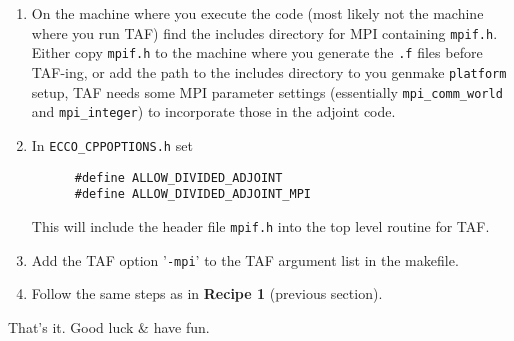 \begin{enumerate}

\item
On the machine where you execute the code
(most likely not the machine where you run TAF)
find the includes directory for MPI containing {\tt mpif.h}.
Either copy {\tt mpif.h} to the machine where you generate the
{\tt .f} files before TAF-ing, or add the path to the includes
directory to you genmake {\tt platform} setup,
TAF needs some MPI parameter settings 
(essentially {\tt mpi\_comm\_world} and {\tt mpi\_integer})
to incorporate those in the adjoint code.

\item
In {\tt ECCO\_CPPOPTIONS.h} set
%
{\footnotesize
\begin{verbatim}
      #define ALLOW_DIVIDED_ADJOINT
      #define ALLOW_DIVIDED_ADJOINT_MPI
\end{verbatim}
}
%
This will include the header file {\tt mpif.h}
into the top level routine for TAF.

\item
Add the TAF option '{\tt -mpi}' to the TAF argument list in the makefile.

\item
Follow the same steps as in {\bf Recipe 1} (previous section).

\end{enumerate}

That's it. Good luck \& have fun.

